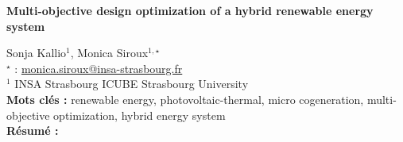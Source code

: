 


    \newpage


%
\begin{flushleft}
\addtocounter{section}{1}
{\Large \textbf{Multi-objective design optimization of a hybrid renewable energy system}}\label{ref:3}
\end{flushleft}
%
Sonja Kallio$^{1}$, Monica Siroux$^{1,\star}$\\[2mm]
$^{\star}$ \Letter : \url{monica.siroux@insa-strasbourg.fr}\\[2mm]
{\footnotesize $^{1}$ INSA Strasbourg ICUBE Strasbourg University}\\
[4mm]
%
\noindent \textbf{Mots clés : } renewable energy, photovoltaic-thermal, micro cogeneration, multi-objective optimization, hybrid energy system\\[4mm]
%
\noindent \textbf{Résumé : } 

